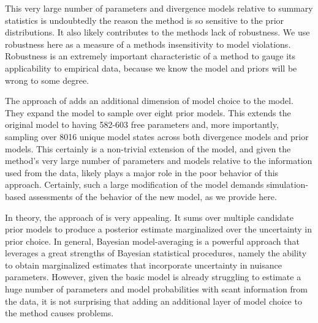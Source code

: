 \documentclass[letterpaper,12pt]{article}
\begin{document}
\begin{linenumbers}
This very large number of parameters and divergence models relative to 
summary statistics is undoubtedly the reason the method is so sensitive
to the prior distributions.
It also likely contributes to the methods lack of robustness.
We use robustness here as a measure of a methods insensitivity to model
violations.
Robustness is an extremely important characteristic of a method to gauge its
applicability to empirical data, because we know the model and priors will be
wrong to some degree.

The approach of \citet{Hickerson2013} adds an additional dimension of model
choice to the model. They expand the model to sample over eight prior models.
This extends the original model to having 582-603 free parameters and, more
importantly, sampling over 8016 unique model states across both divergence
models and prior models.
This certainly is a non-trivial extension of the model, and given the method's
very large number of parameters and models relative to the information used
from the data, likely plays a major role in the poor behavior of this approach.
Certainly, such a large modification of the model demands simulation-based
assessments of the behavior of the new model, as we provide here.


In theory, the approach of \citet{Hickerson2013} is very appealing.  It sums
over multiple candidate prior models to produce a posterior estimate
marginalized over the uncertainty in prior choice.
In general, Bayesian model-averaging is a powerful approach that leverages a
great strengths of Bayesian statistical procedures, namely the ability to
obtain marginalized estimates that incorporate uncertainty in nuisance
parameters.
However, given the basic \msb model is already struggling to estimate
a huge number of parameters and model probabilities with scant information
from the data, it is not surprising that adding an additional layer of
model choice to the method causes problems.


\end{linenumbers}
\end{document}
